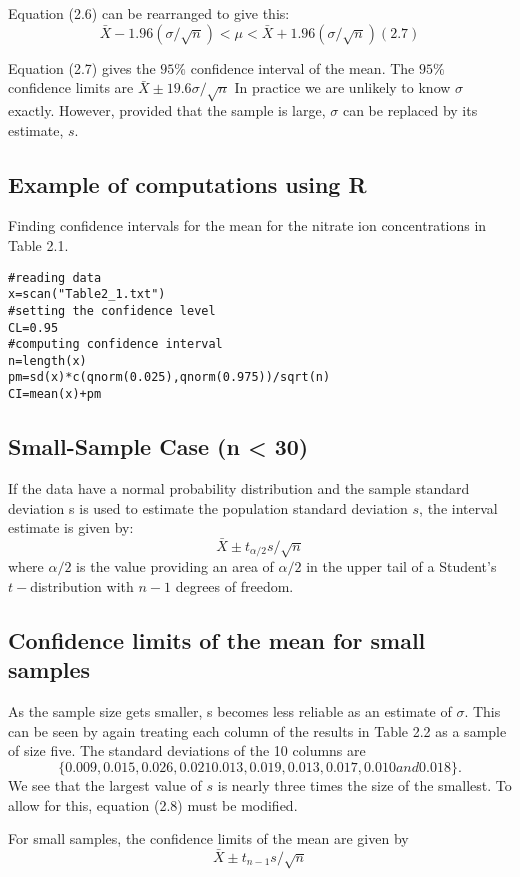 \documentclass[a4paper,12pt]{article}
\begin{document}
Equation (2.6) can be rearranged to give this:
\[ \bar{X} - 1.96(\sigma/\sqrt{n}) < \mu < \bar{X} + 1.96(\sigma/\sqrt{n}) (2.7)\]

Equation (2.7) gives the $95\%$  confidence interval of the mean. The $95\%$  confidence
limits are $\bar{X} \pm 19.6 \sigma/\sqrt{n}$
In practice we are unlikely to know $\sigma$ exactly. However, provided that the sample is
large, $\sigma$ can be replaced by its estimate, $s$.


\subsection{Example of computations using R}
Finding confidence intervals for the mean for the nitrate ion
concentrations in Table 2.1.
\begin{verbatim}
#reading data
x=scan("Table2_1.txt")
#setting the confidence level
CL=0.95
#computing confidence interval
n=length(x)
pm=sd(x)*c(qnorm(0.025),qnorm(0.975))/sqrt(n)
CI=mean(x)+pm
\end{verbatim}

\subsection{Small-Sample Case (n < 30)}
If the data have a normal probability distribution and the sample
standard deviation s is used to estimate the population
standard deviation $s$, the interval estimate is given by:
\[ \bar{X} \pm t_{\alpha/2}s /\sqrt{n} \]
where $\alpha/2$ is the value providing an area of $\alpha/2$  in the upper tail
of a Student's $t-$distribution with $n - 1$ degrees of freedom.


\subsection{Confidence limits of the mean for small samples}

As the sample size gets smaller, s becomes less reliable as an estimate of $\sigma$. This can
be seen by again treating each column of the results in Table 2.2 as a sample of size
five. The standard deviations of the 10 columns are \[\{0.009, 0.015, 0.026, 0.021
0.013, 0.019, 0.013, 0.017, 0.010 and 0.018\}.\] We see that the largest value of $s$ is
nearly three times the size of the smallest. To allow for this, equation (2.8) must be
modified.

For small samples, the confidence limits of the mean are given by
\[ \bar{X} \pm t_{n-1}s /\sqrt{n} \]
\end{document}
